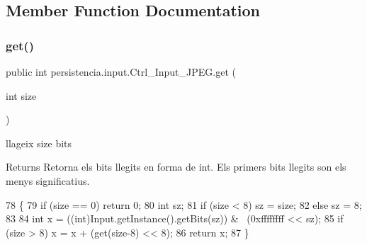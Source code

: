 \subsection{Member Function Documentation}
\mbox{\label{classpersistencia_1_1input_1_1Ctrl__Input__JPEG_a702b13d096ba57f06b242987f0dbf4ec}} 
\subsubsection{\texorpdfstring{get()}{get()}}
{\footnotesize\ttfamily public int persistencia.\+input.\+Ctrl\+\_\+\+Input\+\_\+\+J\+P\+E\+G.\+get (\begin{DoxyParamCaption}\item[{int}]{size }\end{DoxyParamCaption})\hspace{0.3cm}{\ttfamily [inline]}}

llageix \textquotesingle{}size\textquotesingle{} bits \begin{DoxyReturn}{Returns}
Retorna els bits llegits en forma de int. Els primers bits llegits son els menys significatius. 
\end{DoxyReturn}

\begin{DoxyCode}
78                              \{
79         \textcolor{keywordflow}{if} (size == 0) \textcolor{keywordflow}{return} 0;
80         \textcolor{keywordtype}{int} sz;
81         \textcolor{keywordflow}{if} (size < 8) sz = size;
82         \textcolor{keywordflow}{else} sz = 8;
83 
84         \textcolor{keywordtype}{int} x = ((int)Input.getInstance().getBits(sz)) & ~(0xffffffff << sz);
85         \textcolor{keywordflow}{if} (size > 8) x = x + (\textcolor{keyword}{get}(size-8) << 8);
86         \textcolor{keywordflow}{return} x;
87     \}
\end{DoxyCode}
\mbox{\label{classpersistencia_1_1input_1_1Ctrl__Input__JPEG_a173716ac8d17365965ede95f99a8e65a}} 

